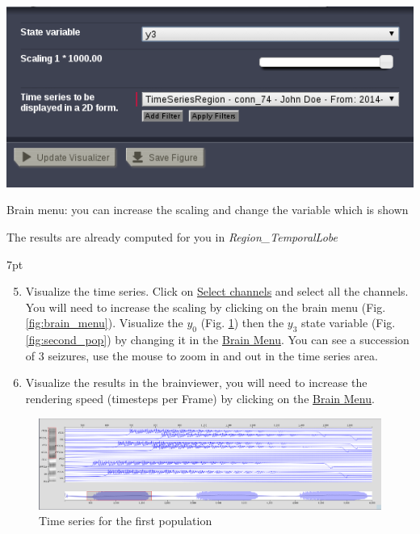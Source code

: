 \documentclass{tufte-handout}
\newenvironment{simulation}{%
  \def\FrameCommand{%
    \hspace{1pt}%
    {\color{ForestGreen}\vrule width 2pt}%
    {\color{simulationshade}\vrule width 4pt}%
    \colorbox{simulationshade}%
  }%
  \MakeFramed{\advance\hsize-\width\FrameRestore}%
  \noindent\hspace{-4.55pt}%
  \begin{adjustwidth}{}{7pt}%
  \vspace{2pt}\vspace{2pt}%
}
{%
  \vspace{2pt}\end{adjustwidth}\endMakeFramed%
}
\begin{document}
\begin{marginfigure}
  \includegraphics[width=\linewidth]{Handout_UI_ModellingAnEpilepticPatient_BrainMenu}%
  \caption{Brain menu: you can increase the scaling and change the variable which is shown}%
  \label{fig:brain_menu}%
\end{marginfigure}

The results are already computed for you in \textit{Region\_TemporalLobe}



\begin{simulation}
  \begin{enumerate}
  \setcounter{enumi}{4}
  \item Visualize the time series. Click on \underline{Select channels} and select all the channels. 
	You will need to increase the scaling by clicking on the brain menu (Fig. \ref{fig:brain_menu}). Visualize 
	the $y_0$ (Fig. \ref{fig:first_pop}) then the $y_3$ state variable (Fig. \ref{fig:second_pop}) by 
	changing it in the \underline{Brain Menu}. You can see a succession of 3 seizures, use the mouse
	 to zoom in and out in the time series area.
  \item Visualize the results in the brainviewer, you will need to increase the rendering speed 
	(timesteps per Frame) by clicking on the \underline{Brain Menu}.
\end{enumerate}
\end{simulation}
  
\begin{figure}[h]
  \includegraphics[width=\linewidth]{Handout_UI_ModellingAnEpilepticPatient_FirstPopulationTimeSeries}%
  \caption{Time series for the first population}%
  \label{fig:first_pop}%
\end{figure}
\end{document}
